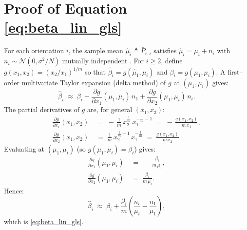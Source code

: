 \documentclass[journal]{IEEEtran}
\begin{document}
\appendices
\section{Proof of Equation \eqref{eq:beta_lin_gls}}
\label{app:beta_lin_gls}
For each orientation \(i\), the sample mean \(\hat\mu_i\triangleq\bar P_{r,i}\) satisfies
\(\hat\mu_i=\mu_i+n_i\) with \(n_i\sim\mathcal N(0,\sigma^2/N)\) mutually independent \cite{Kay1993}. 
For \(i\ge2\), define 
\(g(x_1,x_2)\!=\!(x_2/x_1)^{1/m}\) so that \(\hat\beta_i=g(\hat\mu_1,\hat\mu_i)\) and \(\beta_i=g(\mu_1,\mu_i)\).
A first–order multivariate Taylor expansion (delta method) of \(g\) at \((\mu_1,\mu_i)\) gives:
\begin{equation}
\hat{\beta}_i \;\approx\; \beta_i
+ \frac{\partial g}{\partial x_1}(\mu_1,\mu_i)\,n_1
+ \frac{\partial g}{\partial x_2}(\mu_1,\mu_i)\,n_i. 
\end{equation}
The partial derivatives of \(g\) are, for general \((x_1,x_2)\):
\begin{subequations}
\begin{align}
\frac{\partial g}{\partial x_1}(x_1,x_2) \;&=\; -\,\frac{1}{m}\,x_2^{\frac{1}{m}}\,x_1^{-\frac{1}{m}-1}
\;=\; -\,\frac{g(x_1,x_2)}{m\,x_1},\\[4pt]
\frac{\partial g}{\partial x_2}(x_1,x_2) \;&=\; \frac{1}{m}\,x_2^{\frac{1}{m}-1}\,x_1^{-\frac{1}{m}}
\;=\; \frac{g(x_1,x_2)}{m\,x_2}.
\end{align}
\end{subequations}
Evaluating at \((\mu_1,\mu_i)\) (so \(g(\mu_1,\mu_i)=\beta_i\)) gives:
\begin{subequations}
\begin{align}
\frac{\partial g}{\partial x_1}(\mu_1,\mu_i) \;&=\; -\,\frac{\beta_i}{m\,\mu_1},\\[2pt]
\frac{\partial g}{\partial x_2}(\mu_1,\mu_i) \;&=\; \frac{\beta_i}{m\,\mu_i}.
\end{align}
\end{subequations}
Hence:
\begin{equation}
\hat{\beta}_i \;\approx\; \beta_i
+ \frac{\beta_i}{m}\!\left(\frac{n_i}{\mu_i} - \frac{n_1}{\mu_1}\right),
\end{equation}
which is \eqref{eq:beta_lin_gls}.\hfill\(\square\)
\end{document}

